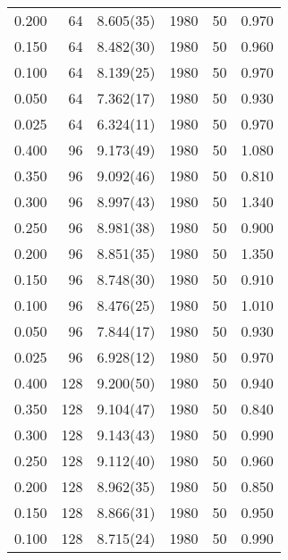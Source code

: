 \begin{tabular}{rrlrrr}
 0.200 &      64 & 8.605(35)  &                1980 &                  50 &    0.970 \\
 0.150 &      64 & 8.482(30)  &                1980 &                  50 &    0.960 \\
 0.100 &      64 & 8.139(25)  &                1980 &                  50 &    0.970 \\
 0.050 &      64 & 7.362(17)  &                1980 &                  50 &    0.930 \\
 0.025 &      64 & 6.324(11)  &                1980 &                  50 &    0.970 \\
 0.400 &      96 & 9.173(49)  &                1980 &                  50 &    1.080 \\
 0.350 &      96 & 9.092(46)  &                1980 &                  50 &    0.810 \\
 0.300 &      96 & 8.997(43)  &                1980 &                  50 &    1.340 \\
 0.250 &      96 & 8.981(38)  &                1980 &                  50 &    0.900 \\
 0.200 &      96 & 8.851(35)  &                1980 &                  50 &    1.350 \\
 0.150 &      96 & 8.748(30)  &                1980 &                  50 &    0.910 \\
 0.100 &      96 & 8.476(25)  &                1980 &                  50 &    1.010 \\
 0.050 &      96 & 7.844(17)  &                1980 &                  50 &    0.930 \\
 0.025 &      96 & 6.928(12)  &                1980 &                  50 &    0.970 \\
 0.400 &     128 & 9.200(50)  &                1980 &                  50 &    0.940 \\
 0.350 &     128 & 9.104(47)  &                1980 &                  50 &    0.840 \\
 0.300 &     128 & 9.143(43)  &                1980 &                  50 &    0.990 \\
 0.250 &     128 & 9.112(40)  &                1980 &                  50 &    0.960 \\
 0.200 &     128 & 8.962(35)  &                1980 &                  50 &    0.850 \\
 0.150 &     128 & 8.866(31)  &                1980 &                  50 &    0.950 \\
 0.100 &     128 & 8.715(24)  &                1980 &                  50 &    0.990 \\

\end{tabular}
